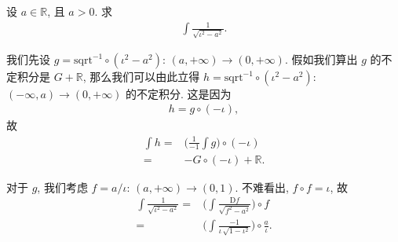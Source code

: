 \begin{example}
    设 $a \in \mathbb{R}$, 且 $a > 0$. 求
    \begin{align*}
        \int {\frac{1}{\sqrt{\iota^2 - a^2}}}.
    \end{align*}

    我们先设 $g = \mathrm{sqrt}^{-1} \circ (\iota^2 - a^2)$: $(a, +\infty) \to (0, +\infty)$. 假如我们算出 $g$ 的不定积分是 $G + \mathbb{R}$, 那么我们可以由此立得 $h = \mathrm{sqrt}^{-1} \circ (\iota^2 - a^2)$: $(-\infty, a) \to (0, +\infty)$ 的不定积分. 这是因为
    \begin{align*}
        h = g \circ (-\iota),
    \end{align*}
    故
    \begin{align*}
        \int {h}
        = {} & \Bigg( \frac{1}{-1} \int {g} \Bigg) \circ (-\iota) \\
        = {} & {-G} \circ (-\iota) + \mathbb{R}.
    \end{align*}

    对于 $g$, 我们考虑 $f = a/\iota$: $(a, +\infty) \to (0, 1)$. 不难看出, $f \circ f = \iota$, 故
    \begin{align*}
        \int {\frac{1}{\sqrt{\iota^2 - a^2}}}
        = {} & \Bigg( \int {\frac{\mathrm{D}f}{\sqrt{f^2 - a^2}}}
        \Bigg) \circ f                                                   \\
        = {} & \Bigg( \int {\frac{-1}{\iota\,\sqrt{1 - \iota^2}}} \Bigg)
        \circ \frac{a}{\iota}.
    \end{align*}


\end{example}
